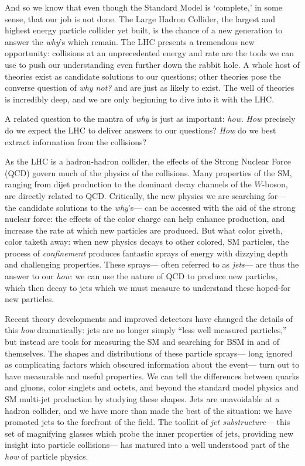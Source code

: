 And so we know that even though the Standard Model is `complete,' in some sense, that our job is not done. The Large Hadron Collider, the largest and highest energy particle collider yet built, is the chance of a new generation to answer the \textit{why}'s which remain. The LHC presents a tremendous new opportunity: collisions at an unprecedented energy and rate are the tools we can use to push our understanding even further down the rabbit hole. A whole host of theories exist as candidate solutions to our questions; other theories pose the converse question of \textit{why not?} and are just as likely to exist. The well of theories is incredibly deep, and we are only beginning to dive into it with the LHC.

A related question to the mantra of \textit{why} is just as important: \textit{how}. \textit{How} precisely do we expect the LHC to deliver answers to our questions? \textit{How} do we best extract information from the collisions?

As the LHC is a hadron-hadron collider, the effects of the Strong Nuclear Force (QCD) govern much of the physics of the collisions. Many properties of the SM, ranging from dijet production to the dominant decay channels of the $W$-boson, are directly related to QCD. Critically, the new physics we are searching for--- the candidate solutions to the \textit{why}'s--- can be accessed with the aid of the strong nuclear force: the effects of the color charge can help enhance production, and increase the rate at which new particles are produced. But what color giveth, color taketh away: when new physics decays to other colored, SM particles, the process of \textit{confinement} produces fantastic sprays of energy with dizzying depth and challenging properties. These sprays--- often referred to as \textit{jets}--- are thus the answer to our \textit{how}: we can use the nature of QCD to produce new particles, which then decay to jets which we must measure to understand these hoped-for new particles.

Recent theory developments and improved detectors have changed the details of this \textit{how} dramatically: jets are no longer simply ``less well measured particles,'' but instead are tools for measuring the SM and searching for BSM in and of themselves. The shapes and distributions of these particle sprays--- long ignored as complicating factors which obscured information about the event--- turn out to have measurable and useful properties. We can tell the differences between quarks and gluons, color singlets and octets, and beyond the standard model physics and SM multi-jet production by studying these shapes. Jets are unavoidable at a hadron collider, and we have more than made the best of the situation: we have promoted jets to the forefront of the field. The toolkit of \textit{jet substructure}--- this set of magnifying glasses which probe the inner properties of jets, providing new insight into particle collisions--- has matured into a well understood part of the \textit{how} of particle physics.

